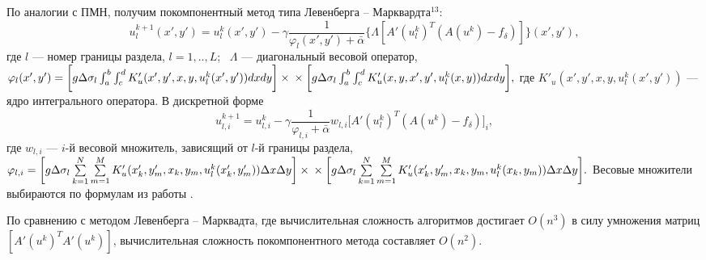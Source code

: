 \documentclass[%
autoref,     %
href,        %
colorlinks,  %
]{disser}
\begin{document}
По аналогии с ПМН, получим покомпонентный метод типа Левенберга -- Марквардта$^{13}$:
$$ u_l^{k+1}(x',y')=u_l^k(x',y')-\gamma\frac{1}{\varphi_l(x',y')+\bar{\alpha}}\big\{\Lambda[ A'(u_l^k)^T(A(u^k)-f_\delta)]\big\}(x',y'),$$
где $l$ --- номер границы раздела, $l=1,..,L$;~ $\Lambda$ --- диагональный весовой оператор, 
$\varphi_l(x',y')=\bigg[ g\Delta\sigma_l\int_{a}^{b}\int_{c}^{d}
K'_u(x', y', x, y, u_l^k(x',y'))dxdy\bigg] \times\notag \\ \times\bigg[g\Delta\sigma_l\int_{a}^{b}\int_{c}^{d}K'_u(x,y, x',y',u_l^k(x,y))dxdy\bigg], $
где $K'_u(x',y', x, y, u_l^k(x',y'))$ --- ядро интегрального оператора.
{\scriptsize
\let\thefootnote\relax\let\thefootnote\relax{}}
В дискретной форме
\begin{equation*}\label{comp_lm_meth_disc}
u_{l,i}^{k+1}=u_{l,i}^k-\gamma\frac{1}{\varphi_{l,i}+\bar{\alpha}}w_{l,i}\big[ A'(u_l^k)^T(A(u^k)-f_\delta)\big]_i,
\end{equation*}
где $w_{l,i}$ --- $i$-й весовой множитель, зависящий от $l$-й границы раздела,\\
$
\varphi_{l,i}=\bigg[ g\Delta\sigma_l\sum\limits_{k=1}^{N}
\sum\limits_{m=1}^{M}
K'_u(x'_k,y'_m, x_k, y_m, u_l^k(x'_k,y'_m)) \Delta x \Delta y\bigg] \times\notag \\ \times\bigg[g\Delta\sigma_l\sum\limits_{k=1}^{N}
\sum\limits_{m=1}^{M}K'_u(x'_k, y'_m, x_k,y_m, u_l^k(x_k,y_m))\Delta x \Delta y\bigg]. \\
$
Весовые множители выбираются по формулам из работы \cite{AkMisSkurTre2015_2}. 

По сравнению с методом Левенберга -- Марквадта, где вычислительная сложность алгоритмов достигает $O(n^3)$ в силу умножения матриц $[A'(u^k)^T A'(u^k)]$, вычислительная сложность покомпонентного метода составляет $O(n^2)$.
\end{document}
